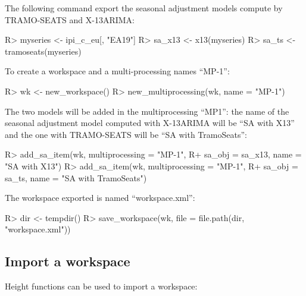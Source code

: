 \documentclass[article]{jss}
\begin{document}
The following command export the seasonal adjustment models compute by
TRAMO-SEATS and X-13ARIMA:

\begin{CodeChunk}

\begin{CodeInput}
R> myseries <- ipi_c_eu[, "EA19"]
R> sa_x13 <- x13(myseries)
R> sa_ts <- tramoseats(myseries)
\end{CodeInput}
\end{CodeChunk}

To create a workspace and a multi-processing names ``MP-1'':

\begin{CodeChunk}

\begin{CodeInput}
R> wk <- new_workspace()
R> new_multiprocessing(wk, name = "MP-1")
\end{CodeInput}
\end{CodeChunk}

The two models will be added in the multiprocessing ``MP1'': the name of
the seasonal adjustment model computed with X-13ARIMA will be ``SA with
X13'' and the one with TRAMO-SEATS will be ``SA with TramoSeats'':

\begin{CodeChunk}

\begin{CodeInput}
R> add_sa_item(wk, multiprocessing = "MP-1",
R+             sa_obj = sa_x13, name =  "SA with X13")
R> add_sa_item(wk, multiprocessing =  "MP-1",
R+             sa_obj = sa_ts, name = "SA with TramoSeats")
\end{CodeInput}
\end{CodeChunk}

The workspace exported is named ``workspace.xml'':

\begin{CodeChunk}

\begin{CodeInput}
R> dir <- tempdir()
R> save_workspace(wk, file =  file.path(dir, "workspace.xml"))
\end{CodeInput}
\end{CodeChunk}

\hypertarget{import-a-workspace}{%
\subsection{Import a workspace}\label{import-a-workspace}}

Height functions can be used to import a workspace:
\end{document}
